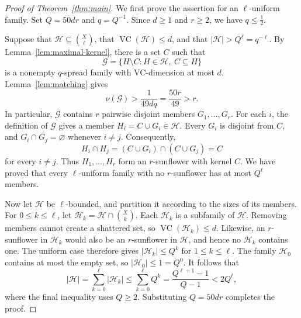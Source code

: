 \documentclass[10pt,a4paper]{amsart}
\newcommand*{\abs}[1]{\lvert#1\rvert}
\newcommand{\cG}{\mathcal{G}}
\newcommand{\cH}{\mathcal{H}}
\newcommand{\VC}{\operatorname{VC}}
\begin{document}
\begin{proof}[Proof of Theorem~\ref{thm:main}]
We first prove the assertion for an \(\ell\)-uniform family. Set \(Q=50dr\) and \(q=Q^{-1}\). Since \(d\ge 1\) and \(r\ge 2\), we have \(q\le\frac{1}{2}\).

Suppose that \(\cH\subseteq\binom{X}{\ell}\), that \(\VC(\cH)\le d\), and that \(\abs{\cH}>Q^{\ell}=q^{-\ell}\). By Lemma~\ref{lem:maximal-kernel}, there is a set \(C\) such that
\[
\cG=\{H\setminus C:H\in\cH,\ C\subseteq H\}
\]
is a nonempty \(q\)-spread family with VC-dimension at most \(d\). Lemma~\ref{lem:matching} gives
\[
\nu(\cG)>\frac{1}{49dq}=\frac{50r}{49}>r.
\]
In particular, \(\cG\) contains \(r\) pairwise disjoint members \(G_{1},\ldots,G_{r}\). For each \(i\), the definition of \(\cG\) gives a member \(H_{i}=C\cup G_{i}\in\cH\). Every \(G_{i}\) is disjoint from \(C\), and \(G_{i}\cap G_{j}=\varnothing\) whenever \(i\ne j\). Consequently,
\[
H_{i}\cap H_{j}=(C\cup G_{i})\cap(C\cup G_{j})=C
\]
for every \(i\ne j\). Thus \(H_{1},\ldots,H_{r}\) form an \(r\)-sunflower with kernel \(C\). We have proved that every \(\ell\)-uniform family with no \(r\)-sunflower has at most \(Q^{\ell}\) members.

Now let \(\cH\) be \(\ell\)-bounded, and partition it according to the sizes of its members. For \(0\le k\le\ell\), let \(\cH_{k}=\cH\cap\binom{X}{k}\). Each \(\cH_{k}\) is a subfamily of \(\cH\). Removing members cannot create a shattered set, so \(\VC(\cH_{k})\le d\). Likewise, an \(r\)-sunflower in \(\cH_{k}\) would also be an \(r\)-sunflower in \(\cH\), and hence no \(\cH_{k}\) contains one. The uniform case therefore gives \(\abs{\cH_{k}}\le Q^{k}\) for \(1\le k\le\ell\). The family \(\cH_{0}\) contains at most the empty set, so \(\abs{\cH_{0}}\le 1=Q^{0}\). It follows that
\[
\abs{\cH}
=\sum_{k=0}^{\ell}\abs{\cH_{k}}
\le\sum_{k=0}^{\ell}Q^{k}
=\frac{Q^{\ell+1}-1}{Q-1}
<2Q^{\ell},
\]
where the final inequality uses \(Q\ge 2\). Substituting \(Q=50dr\) completes the proof.
\end{proof}
\end{document}
